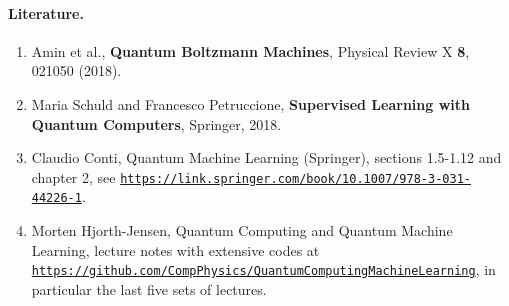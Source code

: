 \documentclass[%
oneside,                 %
final,                   %
10pt]{article}
\begin{document}
\paragraph{Literature.}
\begin{enumerate}
\item Amin et al., \textbf{Quantum Boltzmann Machines}, Physical Review X \textbf{8}, 021050 (2018).

\item Maria Schuld and Francesco Petruccione, \textbf{Supervised Learning with Quantum Computers}, Springer, 2018.

\item Claudio Conti, Quantum Machine Learning (Springer), sections 1.5-1.12 and chapter 2, see \href{{https://link.springer.com/book/10.1007/978-3-031-44226-1}}{\nolinkurl{https://link.springer.com/book/10.1007/978-3-031-44226-1}}.

\item Morten Hjorth-Jensen, Quantum Computing and Quantum Machine Learning, lecture notes with extensive codes at \href{{https://github.com/CompPhysics/QuantumComputingMachineLearning}}{\nolinkurl{https://github.com/CompPhysics/QuantumComputingMachineLearning}}, in particular the last five sets of lectures.
\end{enumerate}

\noindent


\end{document}
